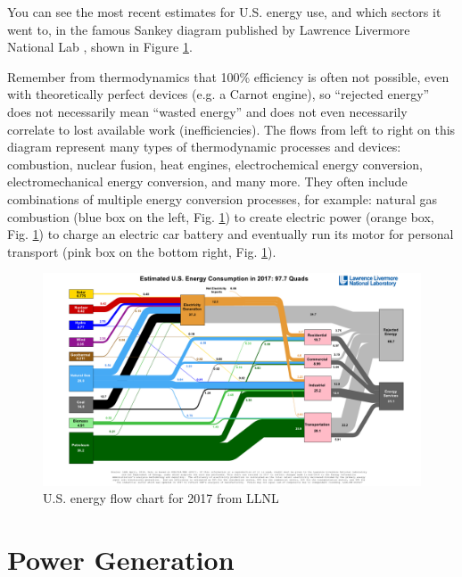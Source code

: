 \documentclass[10pt]{article}
\begin{document}
You can see the most recent estimates for U.S. energy use, and which sectors it went to, in the famous Sankey diagram published by Lawrence Livermore National Lab \cite{noauthor_undated-zv}, shown in Figure \ref{sankey}. 

Remember from thermodynamics that 100\% efficiency is often not possible, even with theoretically perfect devices (e.g. a Carnot engine), so ``rejected energy'' does not necessarily mean ``wasted energy'' and does not even necessarily correlate to lost available work (inefficiencies). The flows from left to right on this diagram represent many types of thermodynamic processes and devices: combustion, nuclear fusion, heat engines, electrochemical energy conversion, electromechanical energy conversion, and many more. They often include combinations of multiple energy conversion processes, for example:  natural gas combustion (blue box on the left, Fig. \ref{sankey}) to create electric power (orange box, Fig. \ref{sankey}) to charge an electric car battery and eventually run its motor for personal transport (pink box on the bottom right, Fig. \ref{sankey}).

            \begin{figure}[h]
            \includegraphics[width=7in]{extras03/2017_United-States_Energy.pdf}
            \caption{U.S. energy flow chart for 2017 from LLNL \cite{noauthor_undated-zv}}
            \label{sankey}
            \end{figure}



\section{Power Generation}

{}
\end{document}
